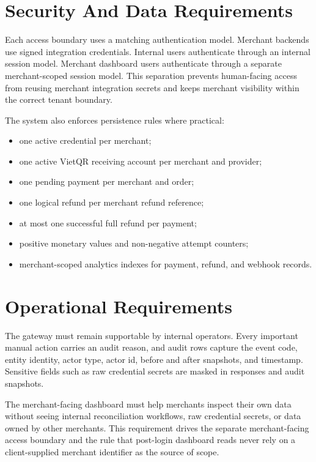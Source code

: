 \section{Security And Data Requirements}

Each access boundary uses a matching authentication model. Merchant backends use
signed integration credentials. Internal users authenticate through an internal
session model. Merchant dashboard users authenticate through a separate
merchant-scoped session model. This separation prevents human-facing access from
reusing merchant integration secrets and keeps merchant visibility within the
correct tenant boundary.

The system also enforces persistence rules where practical:

\begin{itemize}
  \item one active credential per merchant;
  \item one active VietQR receiving account per merchant and provider;
  \item one pending payment per merchant and order;
  \item one logical refund per merchant refund reference;
  \item at most one successful full refund per payment;
  \item positive monetary values and non-negative attempt counters;
  \item merchant-scoped analytics indexes for payment, refund, and webhook
  records.
\end{itemize}

\section{Operational Requirements}

The gateway must remain supportable by internal operators. Every important
manual action carries an audit reason, and audit rows capture the event code,
entity identity, actor type, actor id, before and after snapshots, and
timestamp. Sensitive fields such as raw credential secrets are masked in
responses and audit snapshots.

The merchant-facing dashboard must help merchants inspect their own data without
seeing internal reconciliation workflows, raw credential secrets, or data owned
by other merchants. This requirement drives the separate merchant-facing access
boundary and the rule that post-login dashboard reads never rely on a
client-supplied merchant identifier as the source of scope.
